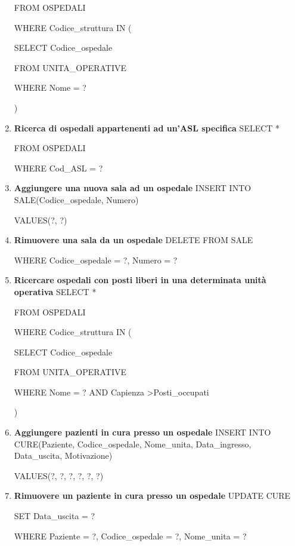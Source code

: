 \documentclass[a4paper,12pt]{report}
\begin{document}
\begin{enumerate}[leftmargin=0cm,itemindent=.5cm,labelwidth=\itemindent,labelsep=0cm,align=left]
    FROM OSPEDALI
    
    WHERE Codice\_struttura IN (
    
        SELECT Codice\_ospedale
    
        FROM UNITA\_OPERATIVE
    
        WHERE Nome = ?

    )

    \item \textbf{Ricerca di ospedali appartenenti ad un'ASL specifica} \newline
    SELECT *
    
    FROM OSPEDALI
    
    WHERE Cod\_ASL = ?

    \item \textbf{Aggiungere una nuova sala ad un ospedale} \newline
    INSERT INTO SALE(Codice\_ospedale, Numero)
    
    VALUES(?, ?)

    \item \textbf{Rimuovere una sala da un ospedale} \newline
    DELETE FROM SALE
    
    WHERE Codice\_ospedale = ?, Numero = ?

    \item \textbf{Ricercare ospedali con posti liberi in una determinata unità operativa} \newline
    SELECT *
    
    FROM OSPEDALI
    
    WHERE Codice\_struttura IN (
    
        SELECT Codice\_ospedale
        
        FROM UNITA\_OPERATIVE
        
        WHERE Nome = ? AND Capienza \textgreater Posti\_occupati 
    
    )

    \item \textbf{Aggiungere pazienti in cura presso un ospedale} \newline
    INSERT INTO CURE(Paziente, Codice\_ospedale, Nome\_unita, Data\_ingresso, Data\_uscita, Motivazione)
    
    VALUES(?, ?, ?, ?, ?, ?)

    \item \textbf{Rimuovere un paziente in cura presso un ospedale} \newline
    UPDATE CURE

    SET Data\_uscita = ?

    WHERE Paziente = ?, Codice\_ospedale = ?, Nome\_unita = ?

\end{enumerate}
\end{document}
